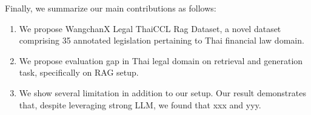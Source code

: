 Finally, we summarize our main contributions as follows:
\begin{enumerate}
    \item {We propose WangchanX Legal ThaiCCL Rag Dataset, a novel dataset comprising 35 annotated legislation pertaining to Thai financial law domain.}
    \item {We propose evaluation gap in Thai legal domain on retrieval and generation task, specifically on RAG setup.}
    \item We show several limitation in addition to our setup. Our result demonstrates that, despite leveraging strong LLM, we found that xxx and yyy.
\end{enumerate}


